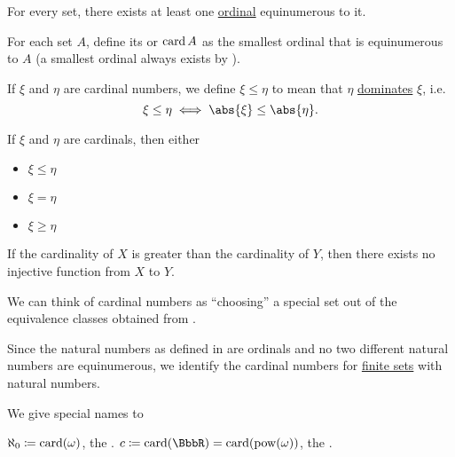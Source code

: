 \medskip

\begin{theorem}\label{thm:equinumerous_ordinal_existence}
  For every set, there exists at least one \hyperref[def:ordinal]{ordinal} equinumerous to it.
\end{theorem}

\medskip

\begin{definition}\label{def:cardinal}
  For each set \( A \), define its  or  \( \operatorname{card} A \) as the smallest ordinal that is equinumerous to \( A \) (a smallest ordinal always exists by ).

  If \( \xi \) and \( \eta \) are cardinal numbers, we define \( \xi \leq \eta \) to mean that \( \eta \) \hyperref[def:set_domination]{dominates} \( \xi \), i.e.
  \begin{equation*}
    \xi \leq \eta \iff \abs{\xi} \leq \abs{\eta}.
  \end{equation*}
\end{definition}

\begin{theorem}\label{thm:cardinal_trichotomy}
  If \( \xi \) and \( \eta \) are cardinals, then either
  \begin{itemize}
    \item \( \xi \leq \eta \)
    \item \( \xi = \eta \)
    \item \( \xi \geq \eta \)
  \end{itemize}
\end{theorem}

\begin{corollary}\label{def:pigeonhole_principle}
  If the cardinality of \( X \) is greater than the cardinality of \( Y \), then there exists no injective function from \( X \) to \( Y \).
\end{corollary}

\begin{remark}\label{rem:cardinals}
  We can think of cardinal numbers as \enquote{choosing} a special set out of the equivalence classes obtained from .

  Since the natural numbers as defined in  are ordinals and no two different natural numbers are equinumerous, we identify the cardinal numbers for \hyperref[def:finite_set]{finite sets} with natural numbers.

  We give special names to
  \begin{thmenum}
     \( \aleph_0 \coloneqq \operatorname{card}(\omega) \), the .
     \( c \coloneqq \card(\BbbR) = \card(\pow(\omega)) \), the .
  \end{thmenum}
\end{remark}

